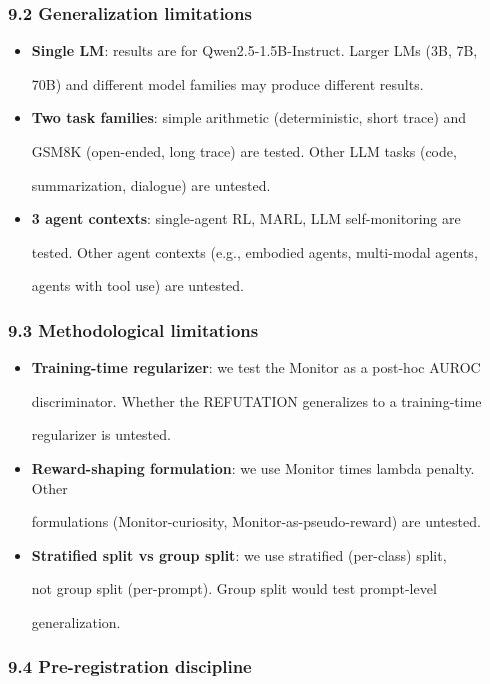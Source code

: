 \documentclass[
]{article}
\begin{document}
\subsubsection{9.2 Generalization
limitations}\label{generalization-limitations}

\begin{itemize}
\item
  \textbf{Single LM}: results are for Qwen2.5-1.5B-Instruct. Larger LMs
  (3B, 7B,

  70B) and different model families may produce different results.
\item
  \textbf{Two task families}: simple arithmetic (deterministic, short
  trace) and

  GSM8K (open-ended, long trace) are tested. Other LLM tasks (code,

  summarization, dialogue) are untested.
\item
  \textbf{3 agent contexts}: single-agent RL, MARL, LLM self-monitoring
  are

  tested. Other agent contexts (e.g., embodied agents, multi-modal
  agents,

  agents with tool use) are untested.
\end{itemize}

\subsubsection{9.3 Methodological
limitations}\label{methodological-limitations}

\begin{itemize}
\item
  \textbf{Training-time regularizer}: we test the Monitor as a post-hoc
  AUROC

  discriminator. Whether the REFUTATION generalizes to a training-time

  regularizer is untested.
\item
  \textbf{Reward-shaping formulation}: we use Monitor times lambda
  penalty. Other

  formulations (Monitor-curiosity, Monitor-as-pseudo-reward) are
  untested.
\item
  \textbf{Stratified split vs group split}: we use stratified
  (per-class) split,

  not group split (per-prompt). Group split would test prompt-level

  generalization.
\end{itemize}

\subsubsection{9.4 Pre-registration
discipline}\label{pre-registration-discipline}
\end{document}
